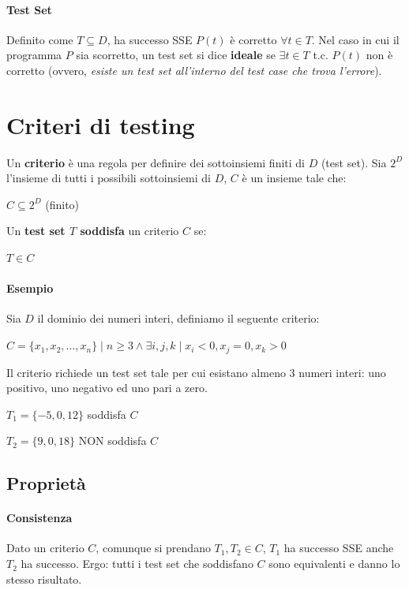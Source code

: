 \paragraph{Test Set} Definito come $T \subseteq D$, ha successo SSE $P(t)$ è corretto $\forall t \in T$. Nel caso in cui il programma $P$ sia scorretto, un test set si dice \textbf{ideale} se $\exists t \in T$ t.c. $P(t)$ non è corretto (ovvero, \textit{esiste un test set all'interno del test case che trova l'errore}).

\section{Criteri di testing}

Un \textbf{criterio} è una regola per definire dei sottoinsiemi finiti di $D$ (test set).
Sia $2^D$ l'insieme di tutti i possibili sottoinsiemi di $D$, $C$ è un insieme tale che:
\begin{center}
    $C \subseteq 2^D$ (finito)
\end{center}
Un \textbf{test set $T$ soddisfa} un criterio $C$ se:
\begin{center}
    $T \in C$    
\end{center}

\paragraph{Esempio} Sia $D$ il dominio dei numeri interi, definiamo il seguente criterio:
\begin{center}
    $C = \{x_1, x_2, ..., x_n\} \mid n \ge 3 \land \exists i, j, k \mid x_i < 0, x_j = 0, x_k > 0$    
\end{center}
Il criterio richiede un test set tale per cui esistano almeno 3 numeri interi: uno positivo, uno negativo ed uno pari a zero.
\begin{center}
    $T_1 = \{-5, 0, 12\}$ soddisfa $C$    
\end{center}
\begin{center}
    $T_2 = \{9, 0, 18\}$ NON soddisfa $C$    
\end{center}

\subsection{Proprietà}

\paragraph{Consistenza} Dato un criterio $C$, comunque si prendano $T_1, T_2 \in C$, $T_1$ ha successo SSE anche $T_2$ ha successo. Ergo: tutti i test set che soddisfano $C$ sono equivalenti e danno lo stesso risultato.

